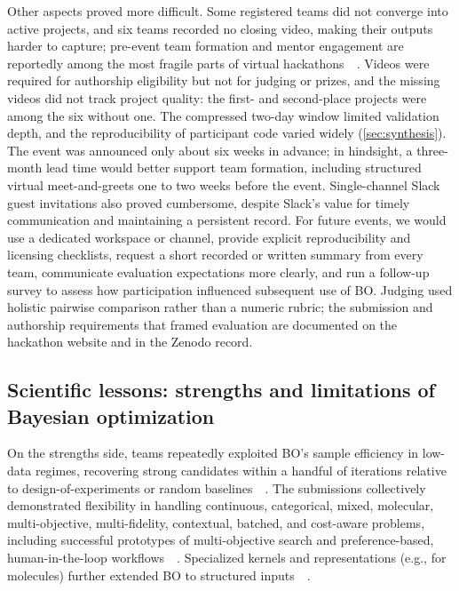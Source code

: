 \documentclass[superscriptaddress, nofootinbib,  amsmath, amssymb, twocolumn]{revtex4-2} %
\let\originalcite\cite
\renewcommand{\cite}[1]{\unskip~\originalcite{#1}}
\begin{document}
Other aspects proved more difficult. Some registered teams did not converge into active projects, and six teams recorded no closing video, making their outputs harder to capture; pre-event team formation and mentor engagement are reportedly among the most fragile parts of virtual hackathons~\cite{diemar_report_2025}. Videos were required for authorship eligibility but not for judging or prizes, and the missing videos did not track project quality: the first- and second-place projects were among the six without one. The compressed two-day window limited validation depth, and the reproducibility of participant code varied widely (\cref{sec:synthesis}). The event was announced only about six weeks in advance; in hindsight, a three-month lead time would better support team formation, including structured virtual meet-and-greets one to two weeks before the event. Single-channel Slack guest invitations also proved cumbersome, despite Slack's value for timely communication and maintaining a persistent record. For future events, we would use a dedicated workspace or channel, provide explicit reproducibility and licensing checklists, request a short recorded or written summary from every team, communicate evaluation expectations more clearly, and run a follow-up survey to assess how participation influenced subsequent use of BO. Judging used holistic pairwise comparison rather than a numeric rubric; the submission and authorship requirements that framed evaluation are documented on the hackathon website and in the Zenodo record.

\subsection{Scientific lessons: strengths and limitations of Bayesian optimization}
\label{sec:sci-lessons}

On the strengths side, teams repeatedly exploited BO's sample efficiency in low-data regimes, recovering strong candidates within a handful of iterations relative to design-of-experiments or random baselines~\cite{frazier_tutorial_2018, shahriari_taking_2016}. The submissions collectively demonstrated flexibility in handling continuous, categorical, mixed, molecular, multi-objective, multi-fidelity, contextual, batched, and cost-aware problems, including successful prototypes of multi-objective search and preference-based, human-in-the-loop workflows~\cite{lin_preference_2022}. Specialized kernels and representations (e.g., for molecules) further extended BO to structured inputs~\cite{griffiths_gauche_2024}.
\end{document}
